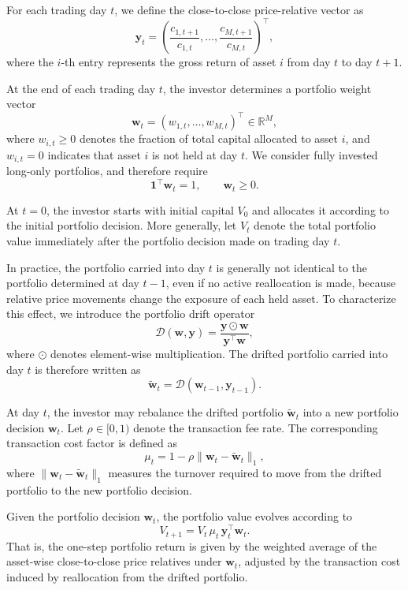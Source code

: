 \documentclass[letterpaper]{article} %
\begin{document}
For each trading day $t$, we define the close-to-close price-relative vector as
\[
\mathbf{y}_t
=
\left(
\frac{c_{1,t+1}}{c_{1,t}},
\dots,
\frac{c_{M,t+1}}{c_{M,t}}
\right)^\top,
\]
where the $i$-th entry represents the gross return of asset $i$ from day $t$ to day $t+1$.

At the end of each trading day $t$, the investor determines a portfolio weight vector
\[
\mathbf{w}_t = (w_{1,t},\dots,w_{M,t})^\top \in \mathbb{R}^M,
\]
where $w_{i,t}\ge 0$ denotes the fraction of total capital allocated to asset $i$, and $w_{i,t}=0$ indicates that asset $i$ is not held at day $t$. We consider fully invested long-only portfolios, and therefore require
\[
\mathbf{1}^\top \mathbf{w}_t = 1,\qquad \mathbf{w}_t \ge 0.
\]

At $t=0$, the investor starts with initial capital $V_0$ and allocates it according to the initial portfolio decision. More generally, let $V_t$ denote the total portfolio value immediately after the portfolio decision made on trading day $t$.

In practice, the portfolio carried into day $t$ is generally not identical to the portfolio determined at day $t-1$, even if no active reallocation is made, because relative price movements change the exposure of each held asset. To characterize this effect, we introduce the portfolio drift operator
\[
\mathcal{D}(\mathbf{w},\mathbf{y})
=
\frac{\mathbf{y}\odot \mathbf{w}}{\mathbf{y}^\top \mathbf{w}},
\]
where $\odot$ denotes element-wise multiplication. The drifted portfolio carried into day $t$ is therefore written as
\[
\tilde{\mathbf{w}}_t
=
\mathcal{D}(\mathbf{w}_{t-1},\mathbf{y}_{t-1}).
\]

At day $t$, the investor may rebalance the drifted portfolio $\tilde{\mathbf{w}}_t$ into a new portfolio decision $\mathbf{w}_t$. Let $\rho\in[0,1)$ denote the transaction fee rate. The corresponding transaction cost factor is defined as
\[
\mu_t
=
1-\rho\|\mathbf{w}_t-\tilde{\mathbf{w}}_t\|_1,
\]
where $\|\mathbf{w}_t-\tilde{\mathbf{w}}_t\|_1$ measures the turnover required to move from the drifted portfolio to the new portfolio decision.

Given the portfolio decision $\mathbf{w}_t$, the portfolio value evolves according to
\[
V_{t+1} = V_t\,\mu_t\, \mathbf{y}_t^\top \mathbf{w}_t.
\]
That is, the one-step portfolio return is given by the weighted average of the asset-wise close-to-close price relatives under $\mathbf{w}_t$, adjusted by the transaction cost induced by reallocation from the drifted portfolio.
\end{document}
